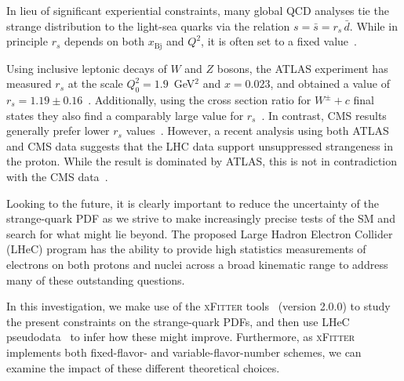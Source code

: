 \documentclass[pdftex,twocolumn,epjc3]{svjour3}          %
\newcommand{\xfitter} {\textsc{xFitter}\xspace}
\newcommand{\xbj}{\ensuremath{x_{\text{Bj}}}\xspace}
\begin{document}
In lieu of significant experiential constraints, many global QCD
analyses tie the strange distribution to the light-sea quarks via the
relation $s= \bar{s}=r_s \, \bar{d}$.
%
While in principle $r_s$ depends on both \xbj and $Q^2$, it is often
set to a fixed value~\cite{Kretzer:2003it, Martin:2004ir}.

Using inclusive leptonic decays of $W$ and $Z$ bosons, the ATLAS
experiment has measured $r_s$ at the scale $Q^2_0 = 1.9$~GeV$^2$ and
$x= 0.023$, and obtained a value of $r_s=1.19 \pm 0.16$~\cite{Aaboud:2016btc}.
%
Additionally, using the cross section ratio for $W^\pm +c$ final
states they also find a comparably large value for $r_s$~\cite{Aad:2014xca}.
%
In contrast, CMS results generally prefer lower $r_s$
values~\cite{Chatrchyan:2013uja,Sirunyan:2018hde}.  However, a recent analysis using
both ATLAS and CMS data suggests that the LHC data support
unsuppressed strangeness in the proton. While the result is dominated
by ATLAS, this is not in contradiction with the CMS
data~\cite{Cooper-Sarkar:2018ufj,Aaboud:2016btc,Aad:2014xca,Chatrchyan:2013uja}.

Looking to the future, it is clearly important to reduce the
uncertainty of the strange-quark PDF as we strive to make increasingly
precise tests of the SM and search for what might lie beyond.
%
The proposed Large Hadron Electron Collider (LHeC) program has the
ability to provide high statistics measurements of electrons on both
protons and nuclei across a broad kinematic range to address many of
these outstanding questions.

In this investigation, we make use of the \xfitter
tools~\cite{Alekhin:2014irh} (version 2.0.0) to study the present constraints on the
strange-quark PDFs, and then use LHeC pseudodata~\cite{AbelleiraFernandez:2012cc} to infer how these
might improve. Furthermore, as \xfitter implements both fixed-flavor-
and variable-flavor-number schemes, we can examine the impact of these
different theoretical choices.

%  
%  
\end{document}
